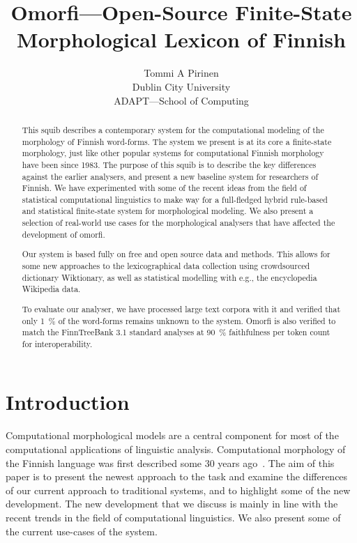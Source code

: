 \documentclass[a4paper,12pt]{article}
\title{Omorfi---Open-Source Finite-State Morphological Lexicon of Finnish}
\author{Tommi A Pirinen \\
    Dublin City University\\
    ADAPT---School of Computing}
\date{}
\begin{document}
\maketitle
\begin{abstract}

    This squib describes a contemporary system for the computational modeling of
    the morphology of Finnish word-forms. The system we present is at its core a
    finite-state morphology, just like other popular systems for computational
    Finnish morphology have been since 1983.  The purpose of this squib is to
    describe the key differences against the earlier analysers, and present
    a new baseline system for researchers of Finnish. We have experimented with
    some of the recent ideas from the field of statistical computational
    linguistics to make way for a full-fledged hybrid rule-based and
    statistical finite-state system for morphological modeling. We also present
    a selection of real-world use cases for the morphological analysers that
    have affected the development of omorfi.

    Our system is based fully on free and open source
    data and methods. This allows for some new
    approaches to the lexicographical data collection
    using crowd\-sour\-ced dictionary Wiktionary, as
    well as statistical modelling with e.g., the
    encyclopedia Wikipedia data.

    To evaluate our analyser, we have processed large text corpora with it
    and verified that only 1~\% of the word-forms remains unknown to the
    system. Omorfi is also verified to match the FinnTreeBank 3.1 standard
    analyses at 90~\% faithfulness per token count for interoperability.
\end{abstract}

\section{Introduction}

Computational morphological models are a central component for most of the
computational applications of linguistic analysis. Computational morphology
of the Finnish language was first described some 30 years
ago~\citep{koskenniemi1983twolevel}. The aim of this paper is to present the
newest approach to the task and examine the differences of our current approach
to traditional systems, and to highlight some of the new development. The
new development that we discuss is mainly in line with the recent trends in
the field of computational linguistics. We also present some of the current
use-cases of the system.
\end{document}
